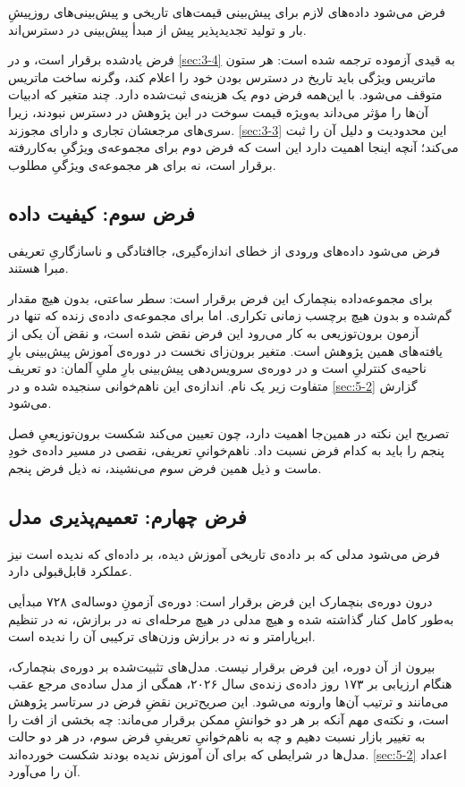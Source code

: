 فرض می‌شود داده‌های لازم برای پیش‌بینی  قیمت‌های تاریخی و پیش‌بینی‌های روزپیشِ
بار و تولید تجدیدپذیر  پیش از مبدأ پیش‌بینی در دسترس‌اند.

فرض یادشده برقرار است، و در \cref{sec:3-4} به قیدی آزموده ترجمه شده است: هر ستون ماتریس ویژگی
باید تاریخ در دسترس بودن خود را اعلام کند، وگرنه ساخت ماتریس متوقف می‌شود. با
این‌همه فرض دوم یک هزینه‌ی ثبت‌شده دارد. چند متغیر که ادبیات آن‌ها را مؤثر می‌داند
 به‌ویژه قیمت سوخت  در این پژوهش در دسترس نبودند، زیرا سری‌های مرجعشان
تجاری و دارای مجوزند. \cref{sec:3-3} این محدودیت و دلیل آن را ثبت می‌کند؛ آنچه اینجا اهمیت
دارد این است که فرض دوم برای مجموعه‌ی ویژگیِ به‌کاررفته برقرار است، نه برای هر
مجموعه‌ی ویژگیِ مطلوب.

\subsection*{فرض سوم: کیفیت داده}

فرض می‌شود داده‌های ورودی از خطای اندازه‌گیری، جاافتادگی و ناسازگاریِ تعریفی مبرا
هستند.

برای مجموعه‌داده بنچمارک این فرض برقرار است:  سطر ساعتی، بدون هیچ مقدار
گم‌شده و بدون هیچ برچسب زمانی تکراری. اما برای مجموعه‌ی داده‌ی زنده  که تنها در
آزمون برون‌توزیعی به کار می‌رود  این فرض نقض شده است، و نقض آن یکی از یافته‌های
همین پژوهش است. متغیر برون‌زای نخست در دوره‌ی آموزش پیش‌بینی بارِ ناحیه‌ی کنترلیِ
 است و در دوره‌ی سرویس‌دهی پیش‌بینی بارِ ملیِ آلمان: دو تعریف متفاوت زیر
یک نام. اندازه‌ی این ناهم‌خوانی سنجیده شده و در \cref{sec:5-2} گزارش می‌شود.

تصریح این نکته در همین‌جا اهمیت دارد، چون تعیین می‌کند شکست برون‌توزیعیِ فصل پنجم را
باید به کدام فرض نسبت داد. ناهم‌خوانیِ تعریفی، نقصی در مسیر داده‌ی خودِ ماست و ذیل
همین فرض سوم می‌نشیند، نه ذیل فرض پنجم.

\subsection*{فرض چهارم: تعمیم‌پذیری مدل}

فرض می‌شود مدلی که بر داده‌ی تاریخی آموزش دیده، بر داده‌ای که ندیده است نیز عملکرد
قابل‌قبولی دارد.

درون دوره‌ی بنچمارک این فرض برقرار است: دوره‌ی آزمونِ دوساله‌ی ۷۲۸ مبدأیی به‌طور کامل
کنار گذاشته شده و هیچ مدلی در هیچ مرحله‌ای  نه در برازش، نه در تنظیم
ابرپارامتر و نه در برازش وزن‌های ترکیبی  آن را ندیده است.

بیرون از آن دوره، این فرض برقرار نیست. مدل‌های تثبیت‌شده بر دوره‌ی بنچمارک، هنگام
ارزیابی بر ۱۷۳ روز داده‌ی زنده‌ی سال ۲۰۲۶، همگی از مدل ساده‌ی مرجع عقب می‌مانند و ترتیب
آن‌ها وارونه می‌شود. این صریح‌ترین نقضِ فرض در سرتاسر پژوهش است، و نکته‌ی مهم آنکه بر
هر دو خوانشِ ممکن برقرار می‌ماند: چه بخشی از افت را به تغییر بازار نسبت دهیم و چه به
ناهم‌خوانیِ تعریفیِ فرض سوم، در هر دو حالت مدل‌ها در شرایطی که برای آن آموزش ندیده
بودند شکست خورده‌اند. \cref{sec:5-2} اعداد آن را می‌آورد.


